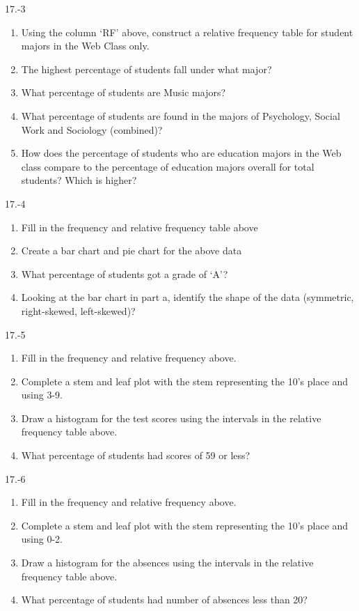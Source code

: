 \begin{exsol@solution}{17.-3}
  \begin{enumerate}
  \item	Using the column `RF' above, construct a relative frequency table for student majors in the Web Class only.
  \item	The highest percentage of students fall under what major?
  \item	What percentage of students are Music majors?
  \item	What percentage of students are found in the majors of Psychology, Social Work and Sociology (combined)?
  \item	How does the percentage of students who are education majors in the Web class compare to the percentage of education majors overall for total students?  Which is higher?
\end{enumerate}
\end{exsol@solution}
\begin{exsol@solution}{17.-4}
  \begin{enumerate}
  \item Fill in the frequency and relative frequency table above
  \item  Create a bar chart and pie chart for the above data
  \item  What percentage of students got a grade of `A'?
  \item  Looking at the bar chart in part a, identify the shape of the data (symmetric, right-skewed, left-skewed)?
\end{enumerate}
\end{exsol@solution}
\begin{exsol@solution}{17.-5}
  \begin{enumerate}
  \item Fill in the frequency and relative frequency above.
  \item	Complete a stem and leaf plot with the stem representing the 10’s place and using 3-9.
  \item Draw a histogram for the test scores using the intervals in the relative frequency table above.
  \item	What percentage of students had scores of 59 or less?
\end{enumerate}

\end{exsol@solution}
\begin{exsol@solution}{17.-6}
\begin{enumerate}
  \item	Fill in the frequency and relative frequency above.
  \item	Complete a stem and leaf plot with the stem representing the 10's place and using 0-2.
  \item	Draw a histogram for the absences using the intervals in the relative frequency table above.
  \item	What percentage of students had number of absences less than 20?
\end{enumerate}

\end{exsol@solution}
